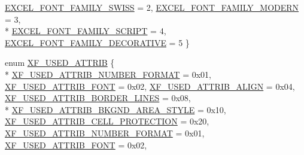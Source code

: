 \begin{DoxyCompactItemize}
\hyperlink{namespace_excel_format_a4f47c1508e4d09e1e52265feed4bedffa1260c7ea55749f1f8f64472318944bab}{E\+X\+C\+E\+L\+\_\+\+F\+O\+N\+T\+\_\+\+F\+A\+M\+I\+L\+Y\+\_\+\+S\+W\+I\+S\+S} = 2, 
\hyperlink{namespace_excel_format_a4f47c1508e4d09e1e52265feed4bedffa6138e3673e0ada2f804cd4ebe800372f}{E\+X\+C\+E\+L\+\_\+\+F\+O\+N\+T\+\_\+\+F\+A\+M\+I\+L\+Y\+\_\+\+M\+O\+D\+E\+R\+N} = 3, 
\\*
\hyperlink{namespace_excel_format_a4f47c1508e4d09e1e52265feed4bedffa28980aa8d83866c2f8df062131aee4f6}{E\+X\+C\+E\+L\+\_\+\+F\+O\+N\+T\+\_\+\+F\+A\+M\+I\+L\+Y\+\_\+\+S\+C\+R\+I\+P\+T} = 4, 
\hyperlink{namespace_excel_format_a4f47c1508e4d09e1e52265feed4bedffa9e9228b64e3bf56fd30b5e6e056b7745}{E\+X\+C\+E\+L\+\_\+\+F\+O\+N\+T\+\_\+\+F\+A\+M\+I\+L\+Y\+\_\+\+D\+E\+C\+O\+R\+A\+T\+I\+V\+E} = 5
 \}
\item 
enum \hyperlink{namespace_excel_format_a416e692866c1c1dab69f10df49071bd1}{X\+F\+\_\+\+U\+S\+E\+D\+\_\+\+A\+T\+T\+R\+I\+B} \{ \\*
\hyperlink{namespace_excel_format_a416e692866c1c1dab69f10df49071bd1a382b7d2c30fcc635461d2cbeebf21d1a}{X\+F\+\_\+\+U\+S\+E\+D\+\_\+\+A\+T\+T\+R\+I\+B\+\_\+\+N\+U\+M\+B\+E\+R\+\_\+\+F\+O\+R\+M\+A\+T} = 0x01, 
\hyperlink{namespace_excel_format_a416e692866c1c1dab69f10df49071bd1a1dcb9bde39270f34af1b6cde0adbf25a}{X\+F\+\_\+\+U\+S\+E\+D\+\_\+\+A\+T\+T\+R\+I\+B\+\_\+\+F\+O\+N\+T} = 0x02, 
\hyperlink{namespace_excel_format_a416e692866c1c1dab69f10df49071bd1a6a8c806126ea5a6f64a83013008b97db}{X\+F\+\_\+\+U\+S\+E\+D\+\_\+\+A\+T\+T\+R\+I\+B\+\_\+\+A\+L\+I\+G\+N} = 0x04, 
\hyperlink{namespace_excel_format_a416e692866c1c1dab69f10df49071bd1a9c1e3100a9d887b7799153af7f531034}{X\+F\+\_\+\+U\+S\+E\+D\+\_\+\+A\+T\+T\+R\+I\+B\+\_\+\+B\+O\+R\+D\+E\+R\+\_\+\+L\+I\+N\+E\+S} = 0x08, 
\\*
\hyperlink{namespace_excel_format_a416e692866c1c1dab69f10df49071bd1a9cf1d8d37f1c943393be205b1db4dd5a}{X\+F\+\_\+\+U\+S\+E\+D\+\_\+\+A\+T\+T\+R\+I\+B\+\_\+\+B\+K\+G\+N\+D\+\_\+\+A\+R\+E\+A\+\_\+\+S\+T\+Y\+L\+E} = 0x10, 
\hyperlink{namespace_excel_format_a416e692866c1c1dab69f10df49071bd1aae3141debd962b0e393d151d3dedc0e7}{X\+F\+\_\+\+U\+S\+E\+D\+\_\+\+A\+T\+T\+R\+I\+B\+\_\+\+C\+E\+L\+L\+\_\+\+P\+R\+O\+T\+E\+C\+T\+I\+O\+N} = 0x20, 
\hyperlink{namespace_excel_format_a416e692866c1c1dab69f10df49071bd1a382b7d2c30fcc635461d2cbeebf21d1a}{X\+F\+\_\+\+U\+S\+E\+D\+\_\+\+A\+T\+T\+R\+I\+B\+\_\+\+N\+U\+M\+B\+E\+R\+\_\+\+F\+O\+R\+M\+A\+T} = 0x01, 
\hyperlink{namespace_excel_format_a416e692866c1c1dab69f10df49071bd1a1dcb9bde39270f34af1b6cde0adbf25a}{X\+F\+\_\+\+U\+S\+E\+D\+\_\+\+A\+T\+T\+R\+I\+B\+\_\+\+F\+O\+N\+T} = 0x02, 

\end{DoxyCompactItemize}
